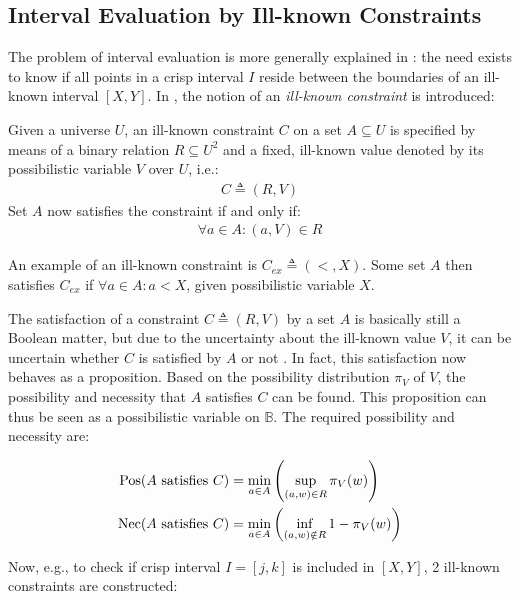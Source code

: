 \subsection{Interval Evaluation by Ill-known Constraints}
The problem of interval evaluation is more generally explained in \cite{Pons2011}: the need exists to know if all points in a crisp interval $I$ reside between the boundaries of an ill-known interval $\left[ X , Y \right]$. In \cite{Pons2011}, the notion of an \emph{ill-known constraint} is introduced:

\begin{definition}
Given a universe $U$, an ill-known constraint $C$ on a set $A \subseteq U$ is specified by means of a binary relation $R \subseteq U^{2}$ and a fixed, ill-known value denoted by its possibilistic variable $V$ over $U$, i.e.:
\begin{align}
C \triangleq (R,V)
\end{align}
Set $A$ now satisfies the constraint if and only if:
\begin{align}
\forall a \in A : (a,V) \in R
\end{align}
\end{definition}

An example of an ill-known constraint is $C_{ex} \triangleq (<, X)$. Some set $A$ then satisfies $C_{ex}$ if $\forall a \in A : a < X$, given possibilistic variable $X$.

The satisfaction of a constraint $C \triangleq (R,V)$ by a set $A$ is basically still a Boolean matter, but due to the uncertainty about the ill-known value $V$, it can be uncertain whether $C$ is satisfied by $A$ or not \cite{Pons2011}. In fact, this satisfaction now behaves as a proposition. Based on the possibility distribution $\pi_{V}$ of $V$, the possibility and necessity that $A$ satisfies $C$ can be found. This proposition can thus be seen as a possibilistic variable on $\mathbb{B}$. The required possibility and necessity are:

\vspace{-10pt}

\begin{align}
\operatorname{Pos}(A\text{ satisfies }C) & = \min_{a \in A}\left(\sup_{(a,w) \in R}\pi_{V}(w)\right) \label{ill-known-pos}\\
\operatorname{Nec}(A\text{ satisfies }C) & = \min_{a \in A}\left(\inf_{(a,w) \notin R} 1-\pi_{V}(w)\right) \label{ill-known-nec}
\end{align}

Now, e.g., to check if crisp interval $I = \left[j, k\right]$ is included in $\left[X, Y\right]$, 2 ill-known constraints are constructed:

